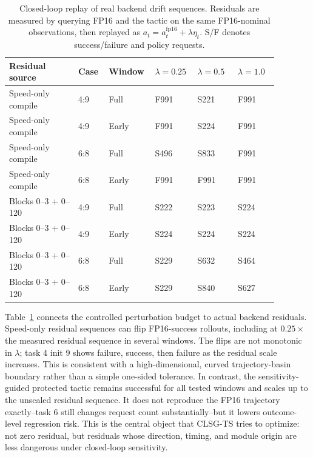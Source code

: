 \documentclass[10pt]{article}
\newcommand{\fp}{\mathrm{fp16}}
\begin{document}
\begin{table}[H]
\centering
\scriptsize
\setlength{\tabcolsep}{2.5pt}
\caption{Closed-loop replay of real backend drift sequences. Residuals are measured by querying FP16 and the tactic on the same FP16-nominal observations, then replayed as $a_t=a_t^{\fp}+\lambda\eta_t$. S/F denotes success/failure and policy requests.}
\label{tab:real-backend-drift-replay}
\begin{tabular}{p{0.24\linewidth}p{0.10\linewidth}p{0.12\linewidth}p{0.14\linewidth}p{0.14\linewidth}p{0.14\linewidth}}
\toprule
Residual source & Case & Window & $\lambda=0.25$ & $\lambda=0.5$ & $\lambda=1.0$ \\
\midrule
Speed-only compile & 4:9 & Full & F991 & S221 & F991 \\
Speed-only compile & 4:9 & Early & F991 & S224 & F991 \\
Speed-only compile & 6:8 & Full & S496 & S833 & F991 \\
Speed-only compile & 6:8 & Early & F991 & F991 & F991 \\
\midrule
Blocks 0--3 + 0--120 & 4:9 & Full & S222 & S223 & S224 \\
Blocks 0--3 + 0--120 & 4:9 & Early & S224 & S224 & S224 \\
Blocks 0--3 + 0--120 & 6:8 & Full & S229 & S632 & S464 \\
Blocks 0--3 + 0--120 & 6:8 & Early & S229 & S840 & S627 \\
\bottomrule
\end{tabular}
\end{table}

Table~\ref{tab:real-backend-drift-replay} connects the controlled perturbation budget to actual backend residuals. Speed-only residual sequences can flip FP16-success rollouts, including at $0.25\times$ the measured residual sequence in several windows. The flips are not monotonic in $\lambda$; task 4 init 9 shows failure, success, then failure as the residual scale increases. This is consistent with a high-dimensional, curved trajectory-basin boundary rather than a simple one-sided tolerance. In contrast, the sensitivity-guided protected tactic remains successful for all tested windows and scales up to the unscaled residual sequence. It does not reproduce the FP16 trajectory exactly--task 6 still changes request count substantially--but it lowers outcome-level regression risk. This is the central object that CLSG-TS tries to optimize: not zero residual, but residuals whose direction, timing, and module origin are less dangerous under closed-loop sensitivity.
\end{document}
